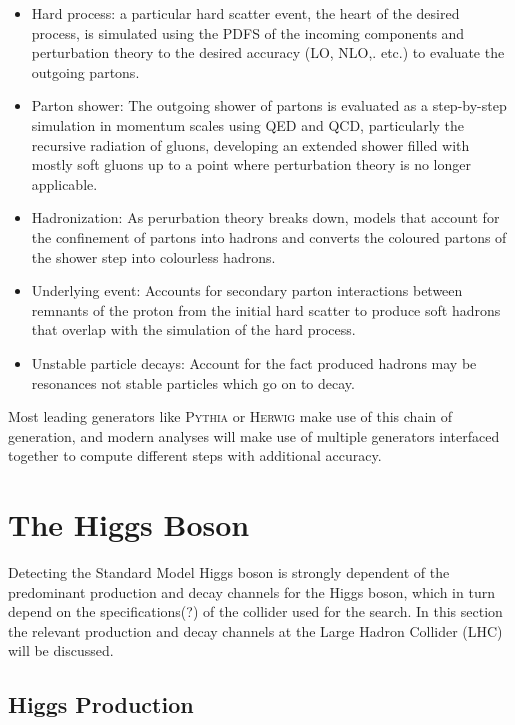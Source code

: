 			\begin{itemize}
				\item Hard process: a particular hard scatter event, the heart of the desired process,  is simulated using the PDFS of the incoming components and perturbation theory to the desired accuracy (LO, NLO,. etc.) to evaluate the outgoing partons.
				\item Parton shower: The outgoing shower of partons is evaluated as a step-by-step simulation in momentum scales using QED and QCD, particularly the recursive radiation of gluons, developing an extended shower filled with mostly soft gluons up to a point where perturbation theory is no longer applicable. 
				\item Hadronization: As perurbation theory breaks down, models that account for the confinement of partons into hadrons and converts the coloured partons of the shower step into colourless hadrons.
				\item Underlying event: Accounts for secondary parton interactions between remnants of the proton from the initial hard scatter to produce soft hadrons that overlap with the simulation of the hard process.
				\item Unstable particle decays: Account for the fact produced hadrons may be resonances not stable particles which go on to decay.	
			\end{itemize}
			
		Most leading generators like \textsc{Pythia} or \textsc{Herwig} make use of this chain of generation, and modern analyses will make use of multiple generators interfaced together to compute different steps with additional accuracy.

\section{The Higgs Boson}
\label{t:higgs}

	Detecting the Standard Model Higgs boson is strongly dependent of the predominant production and decay channels for the Higgs boson, which in turn depend on the specifications(?) of the collider used for the search. In this section the relevant production and decay channels at the Large Hadron Collider (LHC) will be discussed.

	\subsection{Higgs Production}
	
